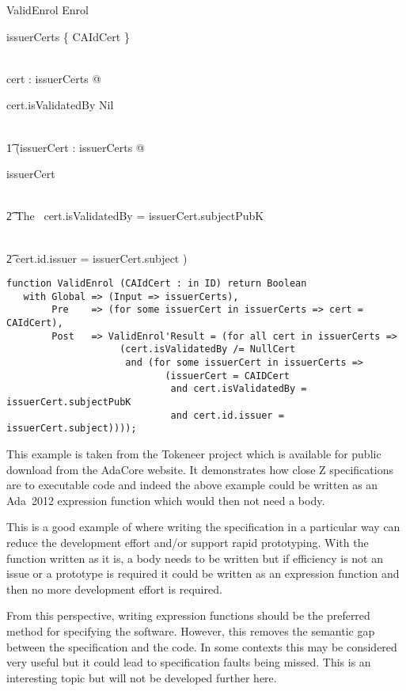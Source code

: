 \documentclass{llncs}
\newcommand{\adatwtw}{Ada~2012\xspace}
\begin{document}
\begin{schema}{ValidEnrol}
Enrol\\ \where

        issuerCerts \cap \{ CAIdCert \} \neq \emptyset

\also

\\ \forall cert : issuerCerts @

           cert.isValidatedBy \neq Nil

\\ \t1 \land (\exists issuerCert : issuerCerts @

        issuerCert 

\\ \t2 \land The \ cert.isValidatedBy = issuerCert.subjectPubK

\\ \t2 \land cert.id.issuer = issuerCert.subject )

\end{schema}

\begin{lstlisting}[language=SPARK]
function ValidEnrol (CAIdCert : in ID) return Boolean
   with Global => (Input => issuerCerts),
        Pre    => (for some issuerCert in issuerCerts => cert = CAIdCert),
        Post   => ValidEnrol'Result = (for all cert in issuerCerts =>
                    (cert.isValidatedBy /= NullCert
                     and (for some issuerCert in issuerCerts =>
                            (issuerCert = CAIDCert
                             and cert.isValidatedBy = issuerCert.subjectPubK
                             and cert.id.issuer = issuerCert.subject))));
\end{lstlisting}

This example is taken from the Tokeneer project which is available for
public download from the AdaCore website. It demonstrates how close Z
specifications are to executable code and indeed the above example
could be written as an \adatwtw expression function which would then
not need a body.

This is a good example of where writing the specification in a
particular way can reduce the development effort and/or support rapid
prototyping. With the function written as it is, a body needs to be
written but if efficiency is not an issue or a prototype is required
it could be written as an expression function and then no more
development effort is required.

From this perspective, writing expression functions should be the
preferred method for specifying the software. However, this removes
the semantic gap between the specification and the code. In some
contexts this may be considered very useful but it could lead to
specification faults being missed. This is an interesting topic but
will not be developed further here.
\end{document}
